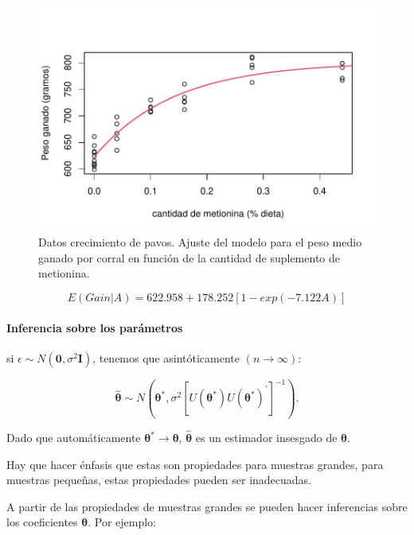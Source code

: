 \documentclass[
]{article}
\begin{document}
\begin{figure}

{\centering \includegraphics{MLG2_files/figure-latex/plotpavoscrec-1} 

}

\caption{Datos crecimiento de pavos. Ajuste del modelo para el peso medio ganado por corral en función de la cantidad de suplemento de metionina.}\label{fig:plotpavoscrec}
\end{figure}

\[
E(Gain|A)=622.958 + 178.252 [1 - exp(-7.122A)]    
\]

\hypertarget{inferencia-sobre-los-paruxe1metros}{%
\paragraph{Inferencia sobre los parámetros}\label{inferencia-sobre-los-paruxe1metros}}

si \(\epsilon \sim N(\boldsymbol 0,\sigma^2 \boldsymbol I)\), tenemos que asintóticamente \((n \to \infty)\):

\[
\hat{\boldsymbol \theta}\sim N(\boldsymbol \theta^*,\sigma^2[U(\boldsymbol \theta^*)U(\boldsymbol \theta^*)^{'}]^{-1}).
\]

Dado que automáticamente \(\boldsymbol \theta^* \to \boldsymbol \theta\), \(\hat{\boldsymbol \theta}\) es un estimador insesgado
de \(\boldsymbol \theta\).

Hay que hacer énfasis que estas son propiedades para muestras
grandes, para muestras pequeñas, estas propiedades pueden ser
inadecuadas.

A partir de las propiedades de muestras grandes se pueden hacer
inferencias sobre los coeficientes \(\boldsymbol \theta\). Por ejemplo:
\end{document}
